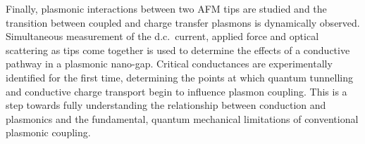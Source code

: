 \documentclass[12pt, a4paper, oneside]{book}
\begin{document}
Finally, plasmonic interactions between two AFM tips are studied and the transition between coupled and charge transfer plasmons is dynamically observed. Simultaneous measurement of the d.c.\ current, applied force and optical scattering as tips come together is used to determine the effects of a conductive pathway in a plasmonic nano-gap. Critical conductances are experimentally identified for the first time, determining the points at which quantum tunnelling and conductive charge transport begin to influence plasmon coupling. This is a step towards fully understanding the relationship between conduction and plasmonics and the fundamental, quantum mechanical limitations of conventional plasmonic coupling.
\end{document}
